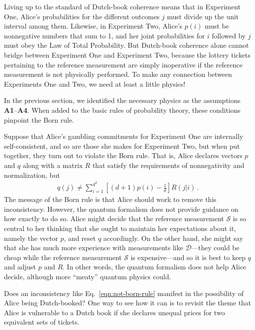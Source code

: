 \documentclass[%
 reprint,superscriptaddress,
 amsmath,amssymb,
 aps,twocolumn,pra
]{revtex4-1}
\newcommand{\eqn}[1]{\begin{eqnarray} #1 \end{eqnarray}}
\newcommand{\zum}[2]{\displaystyle\sum_{#1}^{#2}}
\newcommand{\onestage}{{One}}
\newcommand{\twostage}{{Two}}
\begin{document}
Living up to the standard of Dutch-book coherence means that in Experiment \onestage, Alice's probabilities for the different outcomes $j$ must divide up the unit interval among them. Likewise, in Experiment \twostage{}, Alice's $p(i)$ must be nonnegative numbers that sum to 1, and her joint probabilities for $i$ followed by $j$ must obey the Law of Total Probability. But Dutch-book coherence alone cannot bridge between Experiment \onestage{} and Experiment \twostage, because the lottery tickets pertaining to the reference measurement are simply inoperative if the reference measurement is not physically performed. To make any connection between Experiments \onestage{} and \twostage, we need at least a little physics!

In the previous section, we identified the necessary physics as the assumptions {\bf A1}--{\bf A4}. When added to the basic rules of probability theory, these conditions pinpoint the Born rule.

Suppose that Alice's gambling commitments for Experiment \onestage{} are internally self-consistent, and so are those she makes for Experiment \twostage, but when put together, they turn out to violate the Born rule. That is, Alice declares vectors $p$ and $q$ along with a matrix $R$ that satisfy the requirements of nonnegativity and normalization, but
\eqn{
  q(j) \neq \zum{i=1}{d^2} \left[(d+1) p(i) - \frac{1}{d}\right] R(j|i) \, .
  \label{eqn:not-born-rule}
}
The message of the Born rule is that Alice should work to remove this inconsistency. However, the quantum formalism does not provide guidance on how exactly to do so. Alice might decide that the reference measurement $\mathcal{S}$ is so central to her thinking that she ought to maintain her expectations about it, namely the vector $p$, and reset $q$ accordingly. On the other hand, she might say that she has much more experience with measurements like $\mathcal{D}$---they could be cheap while the reference measurement $\mathcal{S}$ is expensive---and so it is best to keep $q$ and adjust $p$ and $R$. In other words, the quantum formalism does not help Alice decide, although more ``meaty'' quantum physics could.

Does an inconsistency like Eq.\ \eqref{eqn:not-born-rule} manifest in the possibility of Alice being Dutch-booked? One way to see how it can is to revisit the theme that Alice is vulnerable to a Dutch book if she declares unequal prices for two equivalent sets of tickets.
\end{document}
